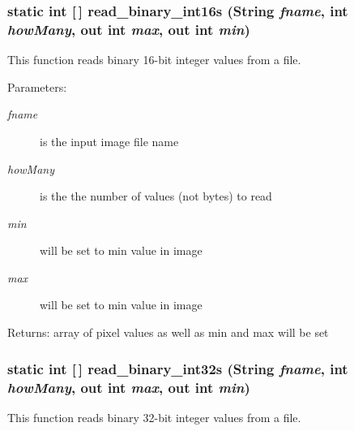 \subsubsection{\setlength{\rightskip}{0pt plus 5cm}static int [$\,$] read\_\-binary\_\-int16s (String {\em fname}, int {\em how\-Many}, out int {\em max}, out int {\em min})\hspace{0.3cm}{\tt  [static, protected]}}\label{class_c_s_image_viewer_1_1pnm_helper_20a1395c35b68ef2a964d34b3474affb}


This function reads binary 16-bit integer values from a file. 

\begin{Desc}
\item[Parameters:]
\begin{description}
\item[{\em fname}]is the input image file name \item[{\em how\-Many}]is the the number of values (not bytes) to read \item[{\em min}]will be set to min value in image \item[{\em max}]will be set to min value in image\end{description}
\end{Desc}
\begin{Desc}
\item[Returns:]array of pixel values as well as min and max will be set \end{Desc}
\subsubsection{\setlength{\rightskip}{0pt plus 5cm}static int [$\,$] read\_\-binary\_\-int32s (String {\em fname}, int {\em how\-Many}, out int {\em max}, out int {\em min})\hspace{0.3cm}{\tt  [static, protected]}}\label{class_c_s_image_viewer_1_1pnm_helper_1cfac7ded3b4522ee9ee39776fe004a4}


This function reads binary 32-bit integer values from a file. 

